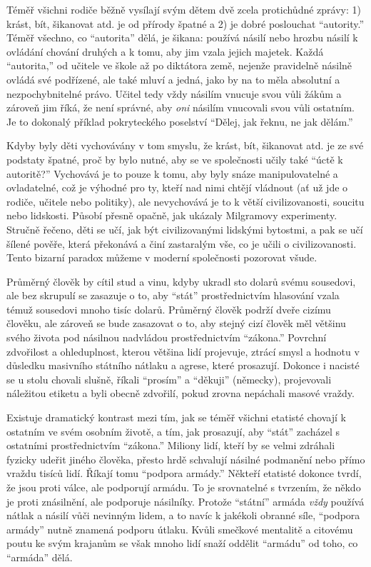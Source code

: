 \documentclass{book}
\begin{document}
Téměř všichni rodiče běžně vysílají svým dětem dvě zcela protichůdné zprávy: 1) krást, bít, šikanovat atd. je od přírody špatné a 2) je dobré poslouchat \enquote{autority.} Téměř všechno, co \enquote{autorita} dělá, je šikana: používá násilí nebo hrozbu násilí k ovládání chování druhých a k tomu, aby jim vzala jejich majetek. Každá \enquote{autorita,} od učitele ve škole až po diktátora země, nejenže pravidelně násilně ovládá své podřízené, ale také mluví a jedná, jako by na to měla absolutní a nezpochybnitelné právo. Učitel tedy vždy násilím vnucuje svou vůli žákům a zároveň jim říká, že není správné, aby \emph{oni} násilím vnucovali svou vůli ostatním. Je to dokonalý příklad pokryteckého poselství \enquote{Dělej, jak řeknu, ne jak dělám.}

Kdyby byly děti vychovávány v tom smyslu, že krást, bít, šikanovat atd. je ze své podstaty špatné, proč by bylo nutné, aby se ve společnosti učily také \enquote{úctě k autoritě?} Vychovává je to pouze k tomu, aby byly snáze manipulovatelné a ovladatelné, což je výhodné pro ty, kteří nad nimi chtějí vládnout (ať už jde o rodiče, učitele nebo politiky), ale nevychovává je to k větší civilizovanosti, soucitu nebo lidskosti. Působí přesně opačně, jak ukázaly Milgramovy experimenty. Stručně řečeno, děti se učí, jak být civilizovanými lidskými bytostmi, a pak se učí šílené pověře, která překonává a činí zastaralým vše, co je učili o civilizovanosti. Tento bizarní paradox můžeme v moderní společnosti pozorovat všude.

Průměrný člověk by cítil stud a vinu, kdyby ukradl sto dolarů svému sousedovi, ale bez skrupulí se zasazuje o to, aby \enquote{stát} prostřednictvím hlasování vzala témuž sousedovi mnoho tisíc dolarů. Průměrný člověk podrží dveře cizímu člověku, ale zároveň se bude zasazovat o to, aby stejný cizí člověk měl většinu svého života pod násilnou nadvládou prostřednictvím \enquote{zákona.} Povrchní zdvořilost a ohleduplnost, kterou většina lidí projevuje, ztrácí smysl a hodnotu v důsledku masivního státního nátlaku a agrese, které prosazují. Dokonce i nacisté se u stolu chovali slušně, říkali \enquote{prosím} a \enquote{děkuji} (německy), projevovali náležitou etiketu a byli obecně zdvořilí, pokud zrovna nepáchali masové vraždy.

Existuje dramatický kontrast mezi tím, jak se téměř všichni etatisté chovají k ostatním ve svém osobním životě, a tím, jak prosazují, aby \enquote{stát} zacházel s ostatními prostřednictvím \enquote{zákona.} Miliony lidí, kteří by se velmi zdráhali fyzicky udeřit jiného člověka, přesto hrdě schvalují násilné podmanění nebo přímo vraždu tisíců lidí. Říkají tomu \enquote{podpora armády.} Někteří etatisté dokonce tvrdí, že jsou proti válce, ale podporují armádu. To je srovnatelné s tvrzením, že někdo je proti znásilnění, ale podporuje násilníky. Protože \enquote{státní} armáda \emph{vždy} používá nátlak a násilí vůči nevinným lidem, a to navíc k jakékoli obranné síle, \enquote{podpora armády} nutně znamená podporu útlaku. Kvůli smečkové mentalitě a citovému poutu ke svým krajanům se však mnoho lidí snaží oddělit \enquote{armádu} od toho, co \enquote{armáda} dělá.
\end{document}
